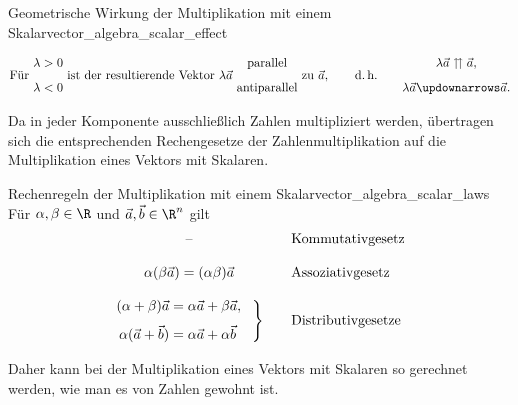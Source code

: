 \begin{KeyPointBox}{Geometrische Wirkung der Multiplikation mit einem Skalar}{vector_algebra_scalar_effect}
  \begin{center}
  \end{center}
  \[
    \text{Für }
    \begin{gathered}
      \lambda>0\\[0.5em]
      \lambda<0
    \end{gathered}
    \text{ ist der resultierende Vektor }\lambda\vec a\text{ }
    \begin{gathered}
      \text{parallel}\\[0.5em]
      \text{antiparallel}
    \end{gathered}
    \text{ zu }\vec a,
    \qquad\text{d.\,h.}\qquad
    \begin{gathered}
      \lambda\vec a\upuparrows\vec a,\\[0.5em]
      \lambda\vec a\updownarrows\vec a.
    \end{gathered}
  \]
\end{KeyPointBox}

Da in jeder Komponente ausschließlich Zahlen multipliziert werden, übertragen
sich die entsprechenden Rechengesetze der Zahlenmultiplikation auf die
Multiplikation eines Vektors mit Skalaren.

\begin{TheoremBox}{Rechenregeln der Multiplikation mit einem Skalar}{vector_algebra_scalar_laws}
  Für $\alpha,\beta\in\R$ und $\vec a,\vec b\in\R^n$ gilt
  \[
    \begin{array}{@{}c@{\qquad}l@{}}
      \text{--}
        & \text{Kommutativgesetz}\\[1.2em]
      \alpha(\beta\vec a)=(\alpha\beta)\vec a
        & \text{Assoziativgesetz}\\[1.2em]
      \left.
        \begin{aligned}
          (\alpha+\beta)\vec a&=\alpha\vec a+\beta\vec a,\\[0.4em]
          \alpha(\vec a+\vec b)&=\alpha\vec a+\alpha\vec b
        \end{aligned}
        \hspace{0.8em}
      \right\}
        & \text{Distributivgesetze}
    \end{array}
  \]
\end{TheoremBox}

Daher kann bei der Multiplikation eines Vektors mit Skalaren so gerechnet
werden, wie man es von Zahlen gewohnt ist.
